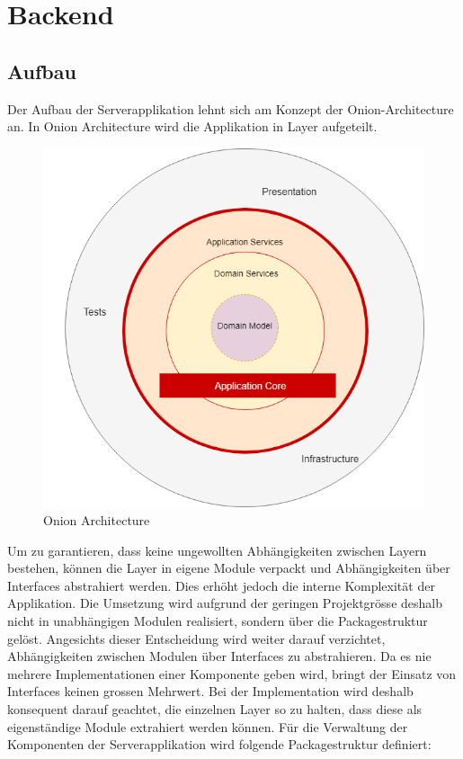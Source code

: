 \section{Backend}

\subsection{Aufbau}

Der Aufbau der Serverapplikation lehnt sich am Konzept der Onion-Architecture an.
In Onion Architecture wird die Applikation in Layer aufgeteilt.

\begin{figure}[h]
    \centering
    \begin{minipage}[b]{0.4\textwidth}
        \includegraphics[width=\textwidth]{graphics/thinktocode-onion}
        \caption{Onion Architecture}
    \end{minipage}\label{fig:figureonion}
\end{figure}

Um zu garantieren, dass keine ungewollten Abhängigkeiten zwischen Layern bestehen, können die Layer in eigene Module verpackt und Abhängigkeiten über Interfaces abstrahiert werden.
Dies erhöht jedoch die interne Komplexität der Applikation.
Die Umsetzung wird aufgrund der geringen Projektgrösse deshalb nicht in unabhängigen Modulen realisiert, sondern über die Packagestruktur gelöst.
Angesichts dieser Entscheidung wird weiter darauf verzichtet, Abhängigkeiten zwischen Modulen über Interfaces zu abstrahieren.
Da es nie mehrere Implementationen einer Komponente geben wird, bringt der Einsatz von Interfaces keinen grossen Mehrwert.
Bei der Implementation wird deshalb konsequent darauf geachtet, die einzelnen Layer so zu halten, dass diese als eigenständige Module extrahiert werden können.
Für die Verwaltung der Komponenten der Serverapplikation wird folgende Packagestruktur definiert:

